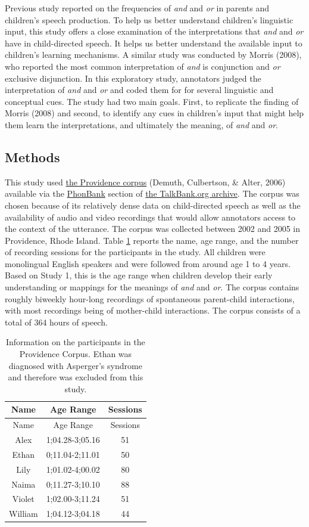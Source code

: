 \documentclass[oneside]{report}
\theoremstyle{definition}
\theoremstyle{definition}
\theoremstyle{definition}
\theoremstyle{remark}
\begin{document}
Previous study reported on the frequencies of \emph{and} and \emph{or}
in parents and children's speech production. To help us better
understand children's linguistic input, this study offers a close
examination of the interpretations that \emph{and} and \emph{or} have in
child-directed speech. It helps us better understand the available input
to children's learning mechanisms. A similar study was conducted by
Morris (2008), who reported the most common interpretation of \emph{and}
is conjunction and \emph{or} exclusive disjunction. In this exploratory
study, annotators judged the interpretation of \emph{and} and \emph{or}
and coded them for for several linguistic and conceptual cues. The study
had two main goals. First, to replicate the finding of Morris (2008) and
second, to identify any cues in children's input that might help them
learn the interpretations, and ultimately the meaning, of \emph{and} and
\emph{or}.

\subsection{Methods}\label{methods}

This study used
\href{https://phonbank.talkbank.org/browser/index.php?url=Eng-NA/Providence/}{the
Providence corpus} (Demuth, Culbertson, \& Alter, 2006) available via
the \href{https://phonbank.talkbank.org}{PhonBank} section of
\href{https://talkbank.org/}{the TalkBank.org archive}. The corpus was
chosen because of its relatively dense data on child-directed speech as
well as the availability of audio and video recordings that would allow
annotators access to the context of the utterance. The corpus was
collected between 2002 and 2005 in Providence, Rhode Island. Table
\ref{tab:providence} reports the name, age range, and the number of
recording sessions for the participants in the study. All children were
monolingual English speakers and were followed from around age 1 to 4
years. Based on Study 1, this is the age range when children develop
their early understanding or mappings for the meanings of \emph{and} and
\emph{or}. The corpus contains roughly biweekly hour-long recordings of
spontaneous parent-child interactions, with most recordings being of
mother-child interactions. The corpus consists of a total of 364 hours
of speech.
\begin{longtable}[]{@{}ccc@{}}
\caption{\label{tab:providence} Information on the participants in the
Providence Corpus. Ethan was diagnosed with Asperger's syndrome and
therefore was excluded from this study.}\tabularnewline
\toprule
Name & Age Range & Sessions\tabularnewline
\midrule
\endfirsthead
\toprule
Name & Age Range & Sessions\tabularnewline
\midrule
\endhead
Alex & 1;04.28-3;05.16 & 51\tabularnewline
Ethan & 0;11.04-2;11.01 & 50\tabularnewline
Lily & 1;01.02-4;00.02 & 80\tabularnewline
Naima & 0;11.27-3;10.10 & 88\tabularnewline
Violet & 1;02.00-3;11.24 & 51\tabularnewline
William & 1;04.12-3;04.18 & 44\tabularnewline
\bottomrule
\end{longtable}
\end{document}
